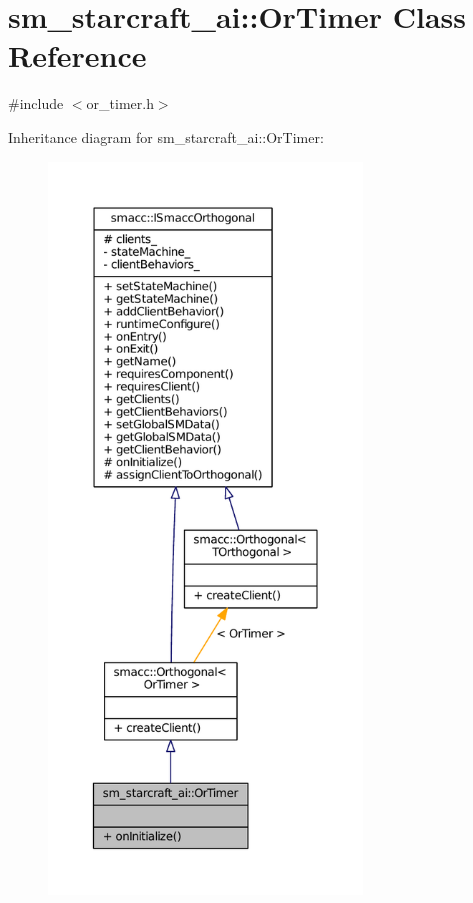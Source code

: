 \hypertarget{classsm__starcraft__ai_1_1OrTimer}{}\section{sm\+\_\+starcraft\+\_\+ai\+:\+:Or\+Timer Class Reference}
\label{classsm__starcraft__ai_1_1OrTimer}


{\ttfamily \#include $<$or\+\_\+timer.\+h$>$}



Inheritance diagram for sm\+\_\+starcraft\+\_\+ai\+:\+:Or\+Timer\+:
\nopagebreak
\begin{figure}[H]
\begin{center}
\leavevmode
\includegraphics[height=550pt]{classsm__starcraft__ai_1_1OrTimer__inherit__graph}
\end{center}
\end{figure}


